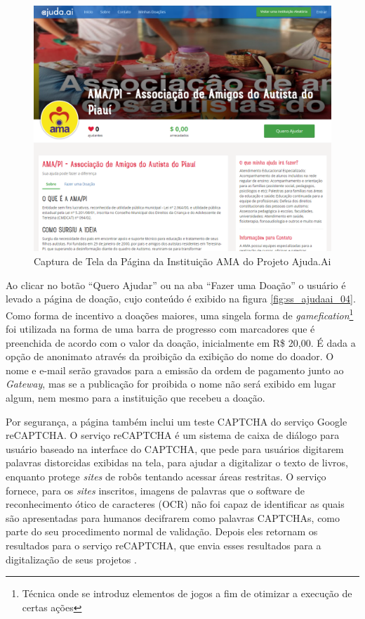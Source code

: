 \begin{figure}[H]
	\caption{\label{fig:ss_ajudaai_03}Captura de Tela da Página da Instituição AMA do Projeto Ajuda.Ai}
    \centering
    \includegraphics[scale=0.4]{imagens/screenshot-ajudaai-03.png}
\end{figure}

Ao clicar no botão ``Quero Ajudar'' ou na aba ``Fazer uma Doação'' o usuário é levado a página de doação, cujo conteúdo é exibido na figura \ref{fig:ss_ajudaai_04}. Como forma de incentivo a doações maiores, uma singela forma de \emph{gamefication}\footnote{Técnica onde se introduz elementos de jogos a fim de otimizar a execução de certas ações} foi utilizada na forma de uma barra de progresso com marcadores que é preenchida de acordo com o valor da doação, inicialmente em R\$ 20,00. É dada a opção de anonimato através da proibição da exibição do nome do doador. O nome e e-mail serão gravados para a emissão da ordem de pagamento junto ao \emph{Gateway}, mas se a publicação for proibida o nome não será exibido em lugar algum, nem mesmo para a instituição que recebeu a doação.

Por segurança, a página também inclui um teste CAPTCHA do serviço Google reCAPTCHA. O serviço reCAPTCHA é um sistema de caixa de diálogo para usuário baseado na interface do CAPTCHA, que pede para usuários digitarem palavras distorcidas exibidas na tela, para ajudar a digitalizar o texto de livros, enquanto protege \emph{sites} de robôs tentando acessar áreas restritas. O serviço fornece, para os \emph{sites} inscritos, imagens de palavras que o software de reconhecimento ótico de caracteres (OCR) não foi capaz de identificar as quais são apresentadas para humanos decifrarem como palavras CAPTCHAs, como parte do seu procedimento normal de validação. Depois eles retornam os resultados para o serviço reCAPTCHA, que envia esses resultados para a digitalização de seus projetos \cite{wiki:ReCAPTCHA}.

